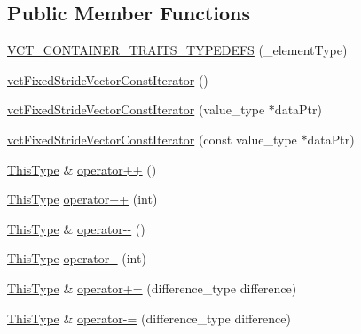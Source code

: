 \subsection*{Public Member Functions}
\begin{DoxyCompactItemize}
\item 
\hyperlink{classvct_fixed_stride_vector_const_iterator_ae72abdca570686594842db2a710f47a8}{V\+C\+T\+\_\+\+C\+O\+N\+T\+A\+I\+N\+E\+R\+\_\+\+T\+R\+A\+I\+T\+S\+\_\+\+T\+Y\+P\+E\+D\+E\+F\+S} (\+\_\+element\+Type)
\item 
\hyperlink{classvct_fixed_stride_vector_const_iterator_afff99a3afb27c3d791a05bca5048098d}{vct\+Fixed\+Stride\+Vector\+Const\+Iterator} ()
\item 
\hyperlink{classvct_fixed_stride_vector_const_iterator_a63eab809728c5f8bf45ed03d2b3784f9}{vct\+Fixed\+Stride\+Vector\+Const\+Iterator} (value\+\_\+type $\ast$data\+Ptr)
\item 
\hyperlink{classvct_fixed_stride_vector_const_iterator_adb3fd8a76fb1cc1e7cd8ed4436fb74f2}{vct\+Fixed\+Stride\+Vector\+Const\+Iterator} (const value\+\_\+type $\ast$data\+Ptr)
\item 
\hyperlink{classvct_fixed_stride_vector_const_iterator_ac60fc9d8c2af56a7f251d9a7040efa1e}{This\+Type} \& \hyperlink{classvct_fixed_stride_vector_const_iterator_a8613a8261e41a424e8b15535d8c9eec3}{operator++} ()
\item 
\hyperlink{classvct_fixed_stride_vector_const_iterator_ac60fc9d8c2af56a7f251d9a7040efa1e}{This\+Type} \hyperlink{classvct_fixed_stride_vector_const_iterator_af5635ad40d200f84e14fdf9e92819022}{operator++} (int)
\item 
\hyperlink{classvct_fixed_stride_vector_const_iterator_ac60fc9d8c2af56a7f251d9a7040efa1e}{This\+Type} \& \hyperlink{classvct_fixed_stride_vector_const_iterator_aa3b87f5babb0a12baaf0120382df8221}{operator-\/-\/} ()
\item 
\hyperlink{classvct_fixed_stride_vector_const_iterator_ac60fc9d8c2af56a7f251d9a7040efa1e}{This\+Type} \hyperlink{classvct_fixed_stride_vector_const_iterator_ab6b7aea9789268c61201fa1113b28295}{operator-\/-\/} (int)
\item 
\hyperlink{classvct_fixed_stride_vector_const_iterator_ac60fc9d8c2af56a7f251d9a7040efa1e}{This\+Type} \& \hyperlink{classvct_fixed_stride_vector_const_iterator_afd2d879218ed8f183be3b733d0919406}{operator+=} (difference\+\_\+type difference)
\item 
\hyperlink{classvct_fixed_stride_vector_const_iterator_ac60fc9d8c2af56a7f251d9a7040efa1e}{This\+Type} \& \hyperlink{classvct_fixed_stride_vector_const_iterator_af4eb0d0c3107139ff5d0dd80ad43a27f}{operator-\/=} (difference\+\_\+type difference)

\end{DoxyCompactItemize}
